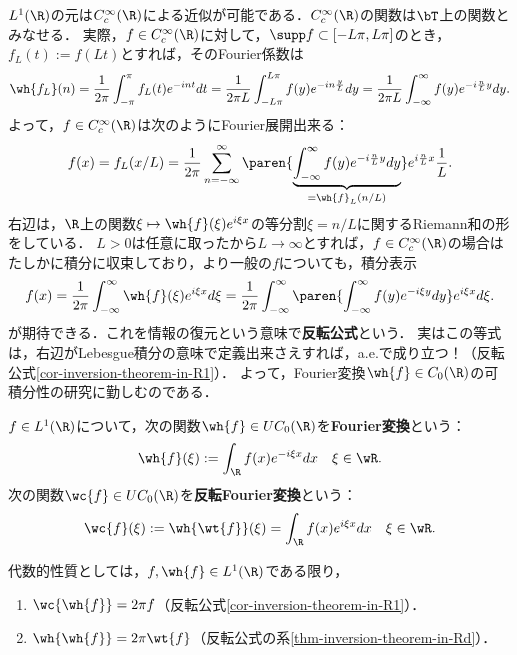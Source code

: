 \documentclass[uplatex,dvipdfmx]{jsreport}
\begin{document}
\begin{observation}
    $L^1(\R)$の元は$C^\infty_c(\R)$による近似が可能である．$C^\infty_c(\R)$の関数は$\bT$上の関数とみなせる．
    実際，$f\in C_c^\infty(\R)$に対して，$\supp f\subset[-L\pi,L\pi]$のとき，$f_L(t):=f(Lt)$とすれば，そのFourier係数は
    \[\wh{f_L}(n)=\frac{1}{2\pi}\int^\pi_{-\pi}f_L(t)e^{-int}dt=\frac{1}{2\pi L}\int^{L\pi}_{-L\pi}f(y)e^{-in\frac{y}{L}}dy=\frac{1}{2\pi L}\int^\infty_{-\infty}f(y)e^{-i\frac{n}{L}y}dy.\]
    よって，$f\in C_c^\infty(\R)$は次のようにFourier展開出来る：
    \[f(x)=f_L(x/L)=\frac{1}{2\pi}\sum_{n=-\infty}^\infty\paren{\underbrace{\int^\infty_{-\infty}f(y)e^{-i\frac{n}{L}y}dy}_{=\wh{f}_L(n/L)}}e^{i\frac{n}{L}x}\frac{1}{L}.\]
    右辺は，$\R$上の関数$\xi\mapsto\wh{f}(\xi)e^{i\xi x}$の等分割$\xi=n/L$に関するRiemann和の形をしている．
    $L>0$は任意に取ったから$L\to\infty$とすれば，$f\in C_c^\infty(\R)$の場合はたしかに積分に収束しており，より一般の$f$についても，積分表示
    \[f(x)=\frac{1}{2\pi}\int^\infty_{-\infty}\wh{f}(\xi)e^{i\xi x}d\xi=\frac{1}{2\pi}\int^\infty_{-\infty}\paren{\int^\infty_{-\infty}f(y)e^{-i\xi y}dy}e^{i\xi x}d\xi.\]
    が期待できる．これを情報の復元という意味で\textbf{反転公式}という．
    実はこの等式は，右辺がLebesgue積分の意味で定義出来さえすれば，a.e.で成り立つ！（反転公式\ref{cor-inversion-theorem-in-R1}）．
    よって，Fourier変換$\wh{f}\in C_0(\R)$の可積分性の研究に勤しむのである．
\end{observation}

\begin{definition}
    $f\in L^1(\R)$について，次の関数$\wh{f}\in UC_0(\R)$を\textbf{Fourier変換}という：
    \[\wh{f}(\xi):=\int_\R f(x)e^{-i\xi x}dx\quad\xi\in\wR.\]
    次の関数$\wc{f}\in UC_0(\R)$を\textbf{反転Fourier変換}という：
    \[\wc{f}(\xi):=\wh{\wt{f}}(\xi)=\int_\R f(x)e^{i\xi x}dx\quad\xi\in\wR.\]
\end{definition}

\begin{remarks}
    代数的性質としては，$f,\wh{f}\in L^1(\R)$である限り，
    \begin{enumerate}
        \item $\wc{\wh{f}}=2\pi f$（反転公式\ref{cor-inversion-theorem-in-R1}）．
        \item $\wh{\wh{f}}=2\pi\wt{f}$（反転公式の系\ref{thm-inversion-theorem-in-Rd}）．
    \end{enumerate}
\end{remarks}
\end{document}

